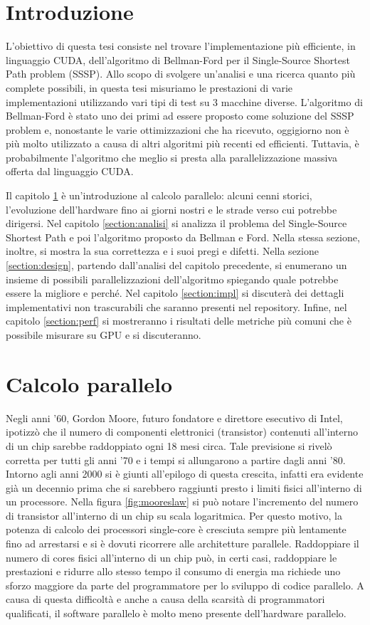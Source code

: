 \documentclass[12pt,a4paper]{book} %
\begin{document}
	\chapter*{Introduzione}
	L'obiettivo di questa tesi consiste nel trovare l'implementazione più efficiente, in linguaggio CUDA, dell'algoritmo di Bellman-Ford per il Single-Source Shortest Path problem (SSSP). Allo scopo di svolgere un'analisi e una ricerca quanto più complete possibili, in questa tesi misuriamo le prestazioni di varie implementazioni utilizzando vari tipi di test su 3 macchine diverse. L'algoritmo di Bellman-Ford è stato uno dei primi ad essere proposto come soluzione del SSSP problem e, nonostante le varie ottimizzazioni che ha ricevuto, oggigiorno non è più molto utilizzato a causa di altri algoritmi più recenti ed efficienti. Tuttavia, è probabilmente l'algoritmo che meglio si presta alla parallelizzazione massiva offerta dal linguaggio CUDA.
	
	Il capitolo \ref{section:storia} è un'introduzione al calcolo parallelo: alcuni cenni storici, l'evoluzione dell'hardware fino ai giorni nostri e le strade verso cui potrebbe dirigersi. Nel capitolo \ref{section:analisi} si analizza il problema del Single-Source Shortest Path e poi l'algoritmo proposto da Bellman e Ford. Nella stessa sezione, inoltre, si mostra la sua correttezza e i suoi pregi e difetti. Nella sezione \ref{section:design}, partendo dall'analisi del capitolo precedente, si enumerano un insieme di possibili parallelizzazioni dell'algoritmo spiegando quale potrebbe essere la migliore e perché. Nel capitolo \ref{section:impl} si discuterà dei dettagli implementativi non trascurabili che saranno presenti nel repository. Infine, nel capitolo \ref{section:perf} si mostreranno i risultati delle metriche più comuni che è possibile misurare su GPU e si discuteranno.
	
	\chapter{Calcolo parallelo}
	\label{section:storia}
	Negli anni '60, Gordon Moore, futuro fondatore e direttore esecutivo di Intel, ipotizzò che il numero di componenti elettronici (transistor) contenuti all'interno di un chip sarebbe raddoppiato ogni 18 mesi circa. Tale previsione si rivelò corretta per tutti gli anni '70 e i tempi si allungarono a partire dagli anni '80. Intorno agli anni 2000 si è giunti all'epilogo di questa crescita, infatti era evidente già un decennio prima che si sarebbero raggiunti presto i limiti fisici all'interno di un processore. Nella figura \ref{fig:mooreslaw} si può notare l'incremento del numero di transistor all'interno di un chip su scala logaritmica. Per questo motivo, la potenza di calcolo dei processori single-core è cresciuta sempre più lentamente fino ad arrestarsi e si è dovuti ricorrere alle architetture parallele. Raddoppiare il numero di cores fisici all'interno di un chip può, in certi casi, raddoppiare le prestazioni e ridurre allo stesso tempo il consumo di energia ma richiede uno sforzo maggiore da parte del programmatore per lo sviluppo di codice parallelo. A causa di questa difficoltà e anche a causa della scarsità di programmatori qualificati, il software parallelo è molto meno presente dell'hardware parallelo.
	
\end{document}
